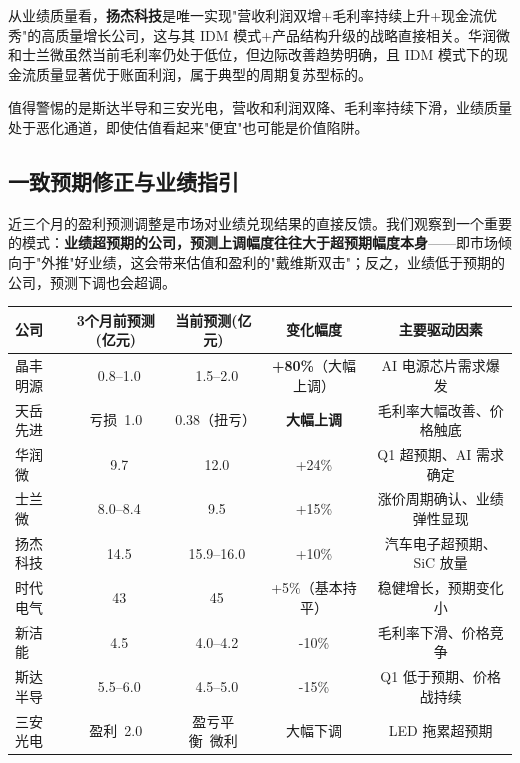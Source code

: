从业绩质量看，\textbf{扬杰科技}是唯一实现"营收利润双增+毛利率持续上升+现金流优秀"的高质量增长公司，这与其 IDM 模式+产品结构升级的战略直接相关。华润微和士兰微虽然当前毛利率仍处于低位，但边际改善趋势明确，且 IDM 模式下的现金流质量显著优于账面利润，属于典型的周期复苏型标的。

值得警惕的是斯达半导和三安光电，营收和利润双降、毛利率持续下滑，业绩质量处于恶化通道，即使估值看起来"便宜"也可能是价值陷阱。

\subsection{一致预期修正与业绩指引}

近三个月的盈利预测调整是市场对业绩兑现结果的直接反馈。我们观察到一个重要的模式：\textbf{业绩超预期的公司，预测上调幅度往往大于超预期幅度本身}——即市场倾向于"外推"好业绩，这会带来估值和盈利的"戴维斯双击"；反之，业绩低于预期的公司，预测下调也会超调。

\begin{exhibitbox}[表 7-8：近 3 个月 2026E 盈利预测调整汇总]
\centering
\small
\begin{tabularx}{\textwidth}{l c c c c}
\toprule
\textbf{公司} & \textbf{3个月前预测(亿元)} & \textbf{当前预测(亿元)} & \textbf{变化幅度} & \textbf{主要驱动因素} \\
\midrule
\rowcolor{riskgreen!10}
晶丰明源 & ~0.8–1.0 & ~1.5–2.0 & \textbf{+80\%}（大幅上调） & AI 电源芯片需求爆发 \\
\rowcolor{riskgreen!10}
天岳先进 & 亏损~1.0 & 0.38（扭亏） & \textbf{大幅上调} & 毛利率大幅改善、价格触底 \\
\rowcolor{riskgreen!10}
华润微 & ~9.7 & ~12.0 & +24\% & Q1 超预期、AI 需求确定 \\
\rowcolor{riskgreen!10}
士兰微 & ~8.0–8.4 & ~9.5 & +15\% & 涨价周期确认、业绩弹性显现 \\
\rowcolor{riskgreen!10}
扬杰科技 & ~14.5 & ~15.9–16.0 & +10\% & 汽车电子超预期、SiC 放量 \\
\rowcolor{riskamber!10}
时代电气 & ~43 & ~45 & +5\%（基本持平） & 稳健增长，预期变化小 \\
\rowcolor{riskred!10}
新洁能 & ~4.5 & ~4.0–4.2 & -10\% & 毛利率下滑、价格竞争 \\
\rowcolor{riskred!10}
斯达半导 & ~5.5–6.0 & ~4.5–5.0 & -15\% & Q1 低于预期、价格战持续 \\
\rowcolor{riskred!10}
三安光电 & 盈利~2.0 & 盈亏平衡~微利 & 大幅下调 & LED 拖累超预期 \\
\bottomrule
\end{tabularx}
\end{exhibitbox}

